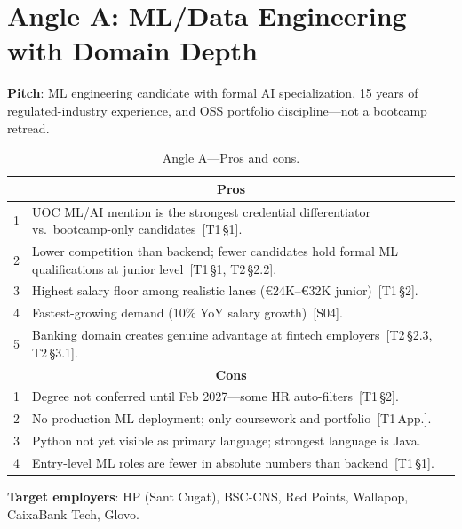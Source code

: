 \documentclass[a4paper,11pt,openany]{report}
\begin{document}

\section{Angle A: ML/Data Engineering with Domain Depth}

\textbf{Pitch}: ML engineering candidate with formal AI specialization, 15
years of regulated-industry experience, and OSS portfolio discipline---not a
bootcamp retread.

\begin{table}[htbp]
\centering
\caption{Angle A---Pros and cons.}
\label{tab:angle-a}
\small
\begin{tabularx}{\textwidth}{c X}
\toprule
\multicolumn{2}{c}{\textbf{Pros}} \\
\midrule
1 & UOC ML/AI mention is the strongest credential differentiator vs.\ bootcamp-only candidates~[T1\,§1]. \\
2 & Lower competition than backend; fewer candidates hold formal ML qualifications at junior level~[T1\,§1, T2\,§2.2]. \\
3 & Highest salary floor among realistic lanes (€24K--€32K junior)~[T1\,§2]. \\
4 & Fastest-growing demand (10\% YoY salary growth)~[S04]. \\
5 & Banking domain creates genuine advantage at fintech employers~[T2\,§2.3, T2\,§3.1]. \\
\midrule
\multicolumn{2}{c}{\textbf{Cons}} \\
\midrule
1 & Degree not conferred until Feb 2027---some HR auto-filters~[T1\,§2]. \\
2 & No production ML deployment; only coursework and portfolio~[T1\,App.]. \\
3 & Python not yet visible as primary language; strongest language is Java. \\
4 & Entry-level ML roles are fewer in absolute numbers than backend~[T1\,§1]. \\
\bottomrule
\end{tabularx}
\end{table}

\textbf{Target employers}: HP (Sant Cugat), BSC-CNS, Red Points, Wallapop,
CaixaBank Tech, Glovo.
\end{document}
